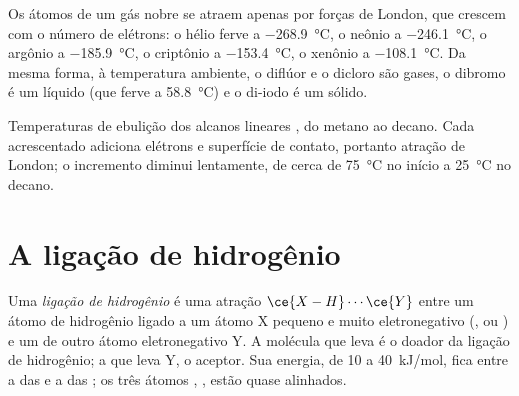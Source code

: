\begin{example}\label{ex:b1:intermolecular-forces-solvents:noble}
Os átomos de um gás nobre se atraem apenas por forças de London, que
crescem com o número de elétrons: o hélio ferve a
\qty{-268.9}{\celsius}, o neônio a \qty{-246.1}{\celsius}, o argônio a
\qty{-185.9}{\celsius}, o criptônio a \qty{-153.4}{\celsius}, o xenônio a
\qty{-108.1}{\celsius}. Da mesma forma, à temperatura ambiente, o
diflúor e o dicloro são gases, o dibromo é um líquido (que ferve a
\qty{58.8}{\celsius}) e o di-iodo é um sólido.
\end{example}

\begin{omfigure}

{\small Temperaturas de ebulição dos alcanos lineares ,
do metano ao decano. Cada  acrescentado adiciona elétrons e
superfície de contato, portanto atração de London; o incremento diminui
lentamente, de cerca de \qty{75}{\celsius} no início a \qty{25}{\celsius}
no decano.}
\end{omfigure}

\section{A ligação de hidrogênio}

\begin{definition}\label{def:b1:intermolecular-forces-solvents:hbond}
Uma \emph{ligação de hidrogênio} é uma atração
$\ce{X-H}\cdots\ce{Y}$ entre um átomo de hidrogênio ligado a um átomo X
pequeno e muito eletronegativo (,  ou ) e um  de outro átomo eletronegativo Y. A molécula que leva  é o
doador da ligação de hidrogênio; a que leva Y, o aceptor. Sua energia, de
10 a \qty{40}{kJ/mol}, fica entre a das  e a
das ; os três átomos , ,  estão
quase alinhados.
\end{definition}

